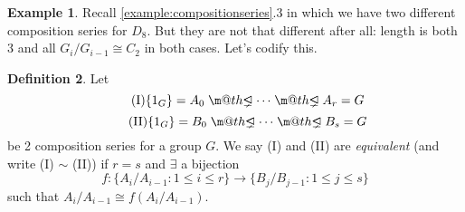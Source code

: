 \documentclass[a4paper]{article}
\makeatletter
\DeclareRobustCommand{\pns}{\mathrel{\text{$\m@th\proper@ideal$}}}
\newcommand{\proper@ideal}{%
  \ooalign{$\lneq$\cr\raise.22ex\hbox{$\lhd$}\cr}%
}
\theoremstyle{definition}
\newtheorem{defn}{Definition}[subsection]
\newtheorem{example}[defn]{Example}
\makeatother
\begin{document}
\begin{example}
Recall \ref{example:compositionseries}.3 in which we have two different composition series for $D_8$. But they are not that different after all: length is both 3 and all $G_i/G_{i-1}\cong C_2$ in both cases. Let's codify this.
\end{example}

\begin{defn}
Let
\[
\tag{I}
\{1_G\}=A_0\pns\cdots\pns A_r=G
\]
\[
\tag{II}
\{1_G\}=B_0\pns\cdots\pns B_s=G
\]
be 2 composition series for a group $G$. We say (I) and (II) are \textit{equivalent} (and write (I) $\sim$ (II)) if $r=s$ and $\exists$ a bijection
\[
f:\{A_i/A_{i-1} : 1\leq i\leq r\} \rightarrow \{B_j/B_{j-1}:1\leq j\leq s\}
\]
such that $A_i/A_{i-1}\cong f(A_i/A_{i-1})$.
\end{defn}
\end{document}
